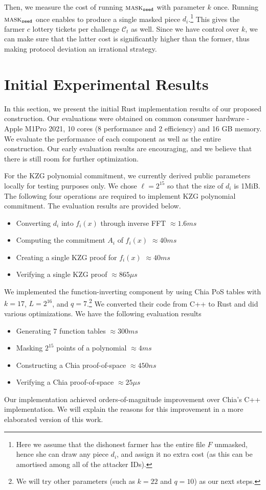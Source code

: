 \documentclass[conference]{IEEEtran}
\newcommand{\seed}{\texttt{seed}}
\newcommand{\mask}{\textsc{mask}}
\begin{document}
Then, we measure the cost of running $\mask_{\seed}$ with parameter $k$ once. Running $\mask_{\seed}$ once enables to produce a single masked piece $d_i$.\footnote{Here we assume that the dishonest farmer has the entire file $F$ unmasked, hence she can draw any piece $d_i$, and assign it no extra cost (as this can be amortised among all of the attacker IDs).} This gives the farmer $c$ lottery tickets per challenge $\mathcal{C}_t$ as well. Since we have control over $k$, we can make sure that the latter cost is significantly higher than the former, thus making protocol deviation an irrational strategy.


\section{Initial Experimental Results}

In this section, we present the initial Rust implementation results of our proposed construction. 
Our evaluations were obtained on common consumer hardware - Apple M1Pro 2021, 10 cores (8 performance and 2 efficiency) and 16 GB memory.
We evaluate the performance of each component as well as the entire construction.  Our early evaluation results are encouraging, and we believe that there is still room for further optimization. 

For the KZG polynomial commitment, we currently derived public parameters locally for testing purposes only. We chose $\ell = 2^{15}$ so that the size of $d_i$ is 1MiB. 
The following four operations are required to implement KZG polynomial commitment. The evaluation results are provided below.
\begin{itemize}
    \item Converting $d_i$ into $f_i(x)$ through inverse FFT $\approx 1.6 ms$
    \item Computing the commitment $A_i$ of $f_i(x)$ $\approx 40 ms$
    \item Creating a single KZG proof for $f_i(x)$ $\approx 40 ms$
    \item Verifying a single KZG proof $\approx 865 \mu s$
\end{itemize}

We implemented the function-inverting component by using Chia PoS tables with $k = 17$, $L = 2^{16}$, and $q = 7$.\footnote{We will try other parameters (such as $k = 22$ and $q = 10$) as our next steps.} We converted their code from C++ to Rust and did various optimizations.  We have the following evaluation results
\begin{itemize}
    \item Generating $7$ function tables $\approx 300 ms$
    \item Masking $2^{15}$ points of a polynomial $\approx 4 ms$
    \item Constructing a Chia proof-of-space $\approx 450 ns$
    \item Verifying a Chia proof-of-space $\approx 25 \mu s$
\end{itemize}   
Our implementation achieved orders-of-magnitude improvement over Chia's C++ implementation. We will explain the reasons for this improvement in a more elaborated version of this work.
\end{document}
